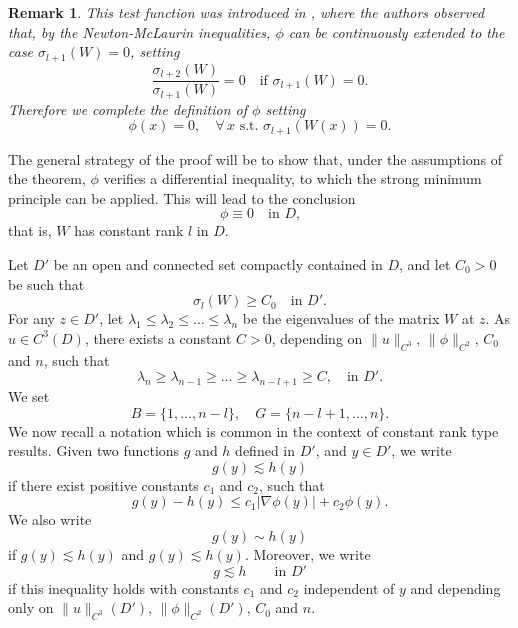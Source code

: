 \documentclass[12pt]{amsart}
\newtheorem{remark}[theorem]{Remark}
\newcommand{\1}{\mathbf 1}
\begin{document}
\begin{remark}\label{testfunction} This test function was introduced in \cite{BG}, where the authors observed that, by the Newton-McLaurin inequalities, $\phi$ can be continuously extended to the case $\sigma_{l+1}(W)=0$, setting
\begin{equation*}
\frac{\sigma_{l+2}(W)}{\sigma_{l+1}(W)}=0\quad\mbox{if $\sigma_{l+1}(W)=0$.}
\end{equation*}
Therefore we complete the definition of $\phi$ setting
\begin{equation}\label{extension}
\phi(x)=0,\quad\mbox{$\forall\, x$ s.t. $\sigma_{l+1}(W(x))=0$.}
\end{equation} \end{remark}


The general strategy of the proof will be to show that, under the assumptions of the theorem, $\phi$ verifies a differential inequality, to which the strong minimum principle can be applied. This will lead to the conclusion
$$
\phi\equiv0\quad\mbox{in $D$,}
$$
that is, $W$ has constant rank $l$ in $D$. 

\medskip

Let $D'$ be an open and connected set compactly contained in $D$, and let $C_0>0$ be such that 
\begin{equation}\label{lbound-l}
\sigma_l(W)\ge C_0\quad\mbox{in $D'$.}
\end{equation}
For any $z\in D'$, let $\lambda_1\le\lambda_2\le\dots\le\lambda_n$ be the eigenvalues of the matrix $W$ at $z$. As $u\in C^3(D)$, there exists a constant $C>0$, depending on $\|u\|_{C^3}$, $\|\phi\|_{C^2}$, $C_0$ and $n$, such that \[\lambda_{n}\ge\lambda_{n-1}\ge\dots\ge\lambda_{n-l+1}\ge C, \quad \mbox{in $D'$}.\] We set
$$ B=\{1,\dots,n-l\},\quad G=\{n-l+1,\dots,n\}. $$
We now recall a notation which is common in the context of constant rank type results. Given two functions $g$ and $h$ defined in $D'$, and $y\in D'$, we write
$$
g(y)\lesssim h(y)
$$
if there exist positive constants $c_1$ and $c_2$, such that
$$
g(y)-h(y)\le c_1|\nabla\phi(y)|+c_2\phi(y).
$$
We also write
$$
g(y)\sim h(y)
$$
if $g(y)\lesssim h(y)$ and $g(y)\lesssim h(y)$. Moreover, we write 
$$
g\lesssim h\qquad \mbox{in $D'$}
$$
if this inequality holds with constants $c_1$ and $c_2$ independent of $y$ and depending only on $\|u\|_{C^3}(D')$, $\|\phi\|_{C^2}(D')$, $C_0$ and $n$. 
\end{document}
